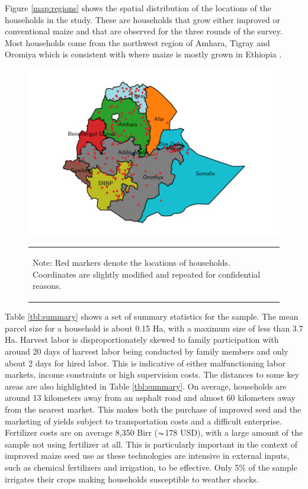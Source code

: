 \documentclass[11pt]{article}
\begin{document}
Figure \ref{map:regions} shows the spatial distribution of the locations of the households in the study. These are households that grow either improved or conventional maize and that are observed for the three rounds of the survey. Most households come from the northwest region of Amhara, Tigray and Oromiya which is consistent with where maize is mostly grown in Ethiopia \citep{Abate2015-rj}.

\begin{figure}[H]
    \centering
    \caption{Spatial Distribution of Households Surveyed}\label{map:regions}
    \includegraphics[width=.7\textwidth]{results/figures/map_hhids.pdf}
    \vspace*{-1em}
    \begin{table}[H]
        \centering
        \begin{tabular}{p{}} 
            \begin{tablenotes}
                  \small
                  \item Note: Red markers denote the locations of households. Coordinates are slightly modified and repeated for confidential reasons.
            \end{tablenotes}
        \end{tabular}
    \end{table}  
\end{figure}

Table \ref{tbl:summary} shows a set of summary statistics for the sample. The mean parcel size for a household is about 0.15 Ha, with a maximum size of less than 3.7 Ha. Harvest labor is disproportionately skewed to family participation with around 20 days of harvest labor being conducted by family members and only about 2 days for hired labor. This is indicative of either malfunctioning labor markets, income constraints or high supervision costs. The distances to some key areas are also highlighted in Table \ref{tbl:summary}. On average, households are around 13 kilometers away from an asphalt road and almost 60 kilometers away from the nearest market. This makes both the purchase of improved seed and the marketing of yields subject to transportation costs and a difficult enterprise. Fertilizer costs are on average 8,350 Birr ($\thicksim$178 USD), with a large amount of the sample not using fertilizer at all. This is particularly important in the context of improved maize seed use as these technologies are intensive in external inputs, such as chemical fertilizers and irrigation, to be effective. Only 5\% of the sample irrigates their crops making households susceptible to weather shocks.
\end{document}
